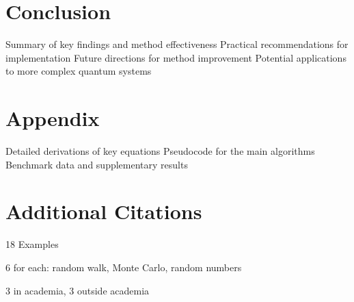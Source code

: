 \documentclass[reqno]{amsart}
\numberwithin{equation}{section}
\numberwithin{figure}{section}
\begin{document}
\section{Conclusion}
Summary of key findings and method effectiveness
Practical recommendations for implementation
Future directions for method improvement
Potential applications to more complex quantum systems

\section*{Appendix}
Detailed derivations of key equations
Pseudocode for the main algorithms
Benchmark data and supplementary results


\appendix
\section{Additional Citations}
18 Examples

6 for each: random walk, Monte Carlo, random numbers

3 in academia, 3 outside academia



\end{document}
